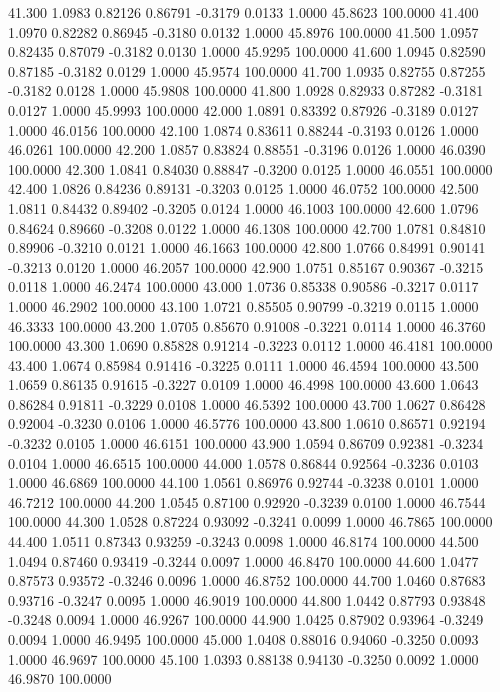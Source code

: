   41.300   1.0983   0.82126   0.86791  -0.3179   0.0133   1.0000  45.8623 100.0000
  41.400   1.0970   0.82282   0.86945  -0.3180   0.0132   1.0000  45.8976 100.0000
  41.500   1.0957   0.82435   0.87079  -0.3182   0.0130   1.0000  45.9295 100.0000
  41.600   1.0945   0.82590   0.87185  -0.3182   0.0129   1.0000  45.9574 100.0000
  41.700   1.0935   0.82755   0.87255  -0.3182   0.0128   1.0000  45.9808 100.0000
  41.800   1.0928   0.82933   0.87282  -0.3181   0.0127   1.0000  45.9993 100.0000
  42.000   1.0891   0.83392   0.87926  -0.3189   0.0127   1.0000  46.0156 100.0000
  42.100   1.0874   0.83611   0.88244  -0.3193   0.0126   1.0000  46.0261 100.0000
  42.200   1.0857   0.83824   0.88551  -0.3196   0.0126   1.0000  46.0390 100.0000
  42.300   1.0841   0.84030   0.88847  -0.3200   0.0125   1.0000  46.0551 100.0000
  42.400   1.0826   0.84236   0.89131  -0.3203   0.0125   1.0000  46.0752 100.0000
  42.500   1.0811   0.84432   0.89402  -0.3205   0.0124   1.0000  46.1003 100.0000
  42.600   1.0796   0.84624   0.89660  -0.3208   0.0122   1.0000  46.1308 100.0000
  42.700   1.0781   0.84810   0.89906  -0.3210   0.0121   1.0000  46.1663 100.0000
  42.800   1.0766   0.84991   0.90141  -0.3213   0.0120   1.0000  46.2057 100.0000
  42.900   1.0751   0.85167   0.90367  -0.3215   0.0118   1.0000  46.2474 100.0000
  43.000   1.0736   0.85338   0.90586  -0.3217   0.0117   1.0000  46.2902 100.0000
  43.100   1.0721   0.85505   0.90799  -0.3219   0.0115   1.0000  46.3333 100.0000
  43.200   1.0705   0.85670   0.91008  -0.3221   0.0114   1.0000  46.3760 100.0000
  43.300   1.0690   0.85828   0.91214  -0.3223   0.0112   1.0000  46.4181 100.0000
  43.400   1.0674   0.85984   0.91416  -0.3225   0.0111   1.0000  46.4594 100.0000
  43.500   1.0659   0.86135   0.91615  -0.3227   0.0109   1.0000  46.4998 100.0000
  43.600   1.0643   0.86284   0.91811  -0.3229   0.0108   1.0000  46.5392 100.0000
  43.700   1.0627   0.86428   0.92004  -0.3230   0.0106   1.0000  46.5776 100.0000
  43.800   1.0610   0.86571   0.92194  -0.3232   0.0105   1.0000  46.6151 100.0000
  43.900   1.0594   0.86709   0.92381  -0.3234   0.0104   1.0000  46.6515 100.0000
  44.000   1.0578   0.86844   0.92564  -0.3236   0.0103   1.0000  46.6869 100.0000
  44.100   1.0561   0.86976   0.92744  -0.3238   0.0101   1.0000  46.7212 100.0000
  44.200   1.0545   0.87100   0.92920  -0.3239   0.0100   1.0000  46.7544 100.0000
  44.300   1.0528   0.87224   0.93092  -0.3241   0.0099   1.0000  46.7865 100.0000
  44.400   1.0511   0.87343   0.93259  -0.3243   0.0098   1.0000  46.8174 100.0000
  44.500   1.0494   0.87460   0.93419  -0.3244   0.0097   1.0000  46.8470 100.0000
  44.600   1.0477   0.87573   0.93572  -0.3246   0.0096   1.0000  46.8752 100.0000
  44.700   1.0460   0.87683   0.93716  -0.3247   0.0095   1.0000  46.9019 100.0000
  44.800   1.0442   0.87793   0.93848  -0.3248   0.0094   1.0000  46.9267 100.0000
  44.900   1.0425   0.87902   0.93964  -0.3249   0.0094   1.0000  46.9495 100.0000
  45.000   1.0408   0.88016   0.94060  -0.3250   0.0093   1.0000  46.9697 100.0000
  45.100   1.0393   0.88138   0.94130  -0.3250   0.0092   1.0000  46.9870 100.0000
